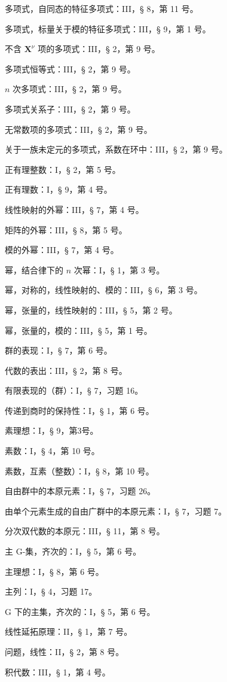 多项式，自同态的特征多项式：III，§ 8，第 11 号。

多项式，标量关于模的特征多项式：III，§ 9，第 1 号。

不含 \(\mathbf{X}^{\nu}\) 项的多项式：III，§ 2，第 9 号。

多项式恒等式：III，§ 2，第 9 号。

\(n\) 次多项式：III，§ 2，第 9 号。

多项式关系子：III，§ 2，第 9 号。

无常数项的多项式：III，§ 2，第 9 号。

关于一族未定元的多项式，系数在环中：III，§ 2，第 9 号。

正有理整数：I，§ 2，第 5 号。

正有理数：I，§ 9，第 4 号。

线性映射的外幂：III，§ 7，第 4 号。

矩阵的外幂：III，§ 8，第 5 号。

模的外幂：III，§ 7，第 4 号。

幂，结合律下的 \(n\) 次幂：I，§ 1，第 3 号。

幂，对称的，线性映射的、模的：III，§ 6，第 3 号。

幂，张量的，线性映射的：III，§ 5，第 2 号。

幂，张量的，模的：III，§ 5，第 1 号。

群的表现：I，§ 7，第 6 号。

代数的表出：III，§ 2，第 8 号。

有限表现的（群）：I，§ 7，习题 16。

传递到商时的保持性：I，§ 1，第 6 号。

素理想：I，§ 9，第3号。

素数：I，§ 4，第 10 号。

素数，互素（整数）：I，§ 8，第 10 号。

自由群中的本原元素：I，§ 7，习题 26。

由单个元素生成的自由广群中的本原元素：I，§ 7，习题 7。

分次双代数的本原元：III，§ 11，第 8 号。

主 G-集，齐次的：I，§ 5，第 6 号。

主理想：I，§ 8，第 6 号。

主列：I，§ 4，习题 17。

G 下的主集，齐次的：I，§ 5，第 6 号。

线性延拓原理：II，§ 1，第 7 号。

问题，线性：II，§ 2，第 8 号。

积代数：III，§ 1，第 4 号。

